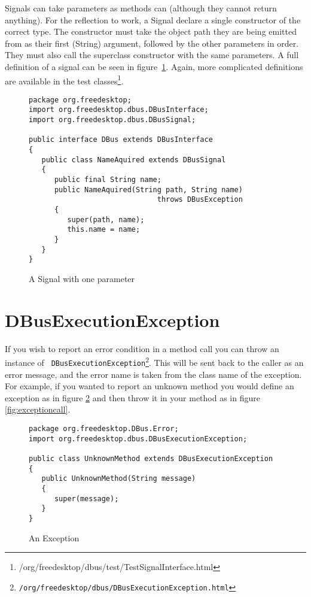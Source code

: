\documentclass[a4paper,12pt]{article}
\begin{document}
Signals can take parameters as methods can (although they cannot return
      anything). For the reflection to work, a Signal declare a single
constructor of the correct type. The constructor must  take the object path
they are being emitted from as their first (String) argument, followed by the
other parameters in order. They must also call the superclass constructor with
the same parameters.  A full definition of a signal can be seen in
figure~\ref{fig:signal}. Again, more complicated definitions are available in
the test
classes\footnote{\javadocroot/org/freedesktop/dbus/test/TestSignalInterface.html}.

\begin{figure}[htb]
\begin{center}
\begin{verbatim}
package org.freedesktop;
import org.freedesktop.dbus.DBusInterface;
import org.freedesktop.dbus.DBusSignal;

public interface DBus extends DBusInterface
{
   public class NameAquired extends DBusSignal
   {
      public final String name;
      public NameAquired(String path, String name) 
                              throws DBusException
      {
         super(path, name);
         this.name = name;
      }
   }
}
\end{verbatim}
\end{center}
\caption{A Signal with one parameter}
\label{fig:signal}
\end{figure}

\section{DBusExecutionException}

If you wish to report an error condition in a method call you can throw an
instance of {\tt
DBusExecutionException\footnote{\javadocroot/org/freedesktop/dbus/DBusExecutionException.html}}.
This will be sent back to the caller as an error message, and the error name is
taken from the class name of the exception. For example, if you wanted to
report an unknown method you would define an exception as in figure
\ref{fig:exceptiondef} and then throw it in your method as in figure
\ref{fig:exceptioncall}.

\begin{figure}[htb]
\begin{center}
\begin{verbatim}
package org.freedesktop.DBus.Error;
import org.freedesktop.dbus.DBusExecutionException;

public class UnknownMethod extends DBusExecutionException
{
   public UnknownMethod(String message)
   {
      super(message);
   }
}
\end{verbatim}
\end{center}
\caption{An Exception}
\label{fig:exceptiondef}
\end{figure}
\end{document}
